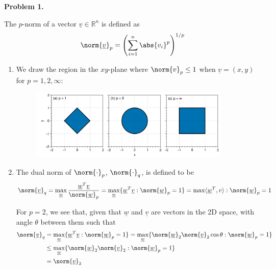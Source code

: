 \textbf{Problem 1.}

The $p$-norm of a vector $\underline{v}\in\mathbb{R}^n$ is defined as
\begin{align*}
    \norm{\underline{v}}_p = \left( \sum_{i=1}^n \abs{v_i}^p \right)^{1/p}
\end{align*}

\begin{enumerate}[label=(\roman*),leftmargin=*,itemsep=0mm]
    
    \item We draw the region in the $xy$-plane where $\norm{v}_p\leq1$ when $\underline{v}=(x,y)$ for $p=1,2,\infty$:
    
    \begin{figure}[h!]
    \centering
    \includegraphics[width=0.9\textwidth]{figures/hw2_qn1.png}\\
    \caption{}
    \label{hw2_qn1}
    \end{figure}
    
    \item The dual norm of $\norm{\cdot}_p$, $\norm{\cdot}_q$, is defined to be
    \begin{align*}
        \norm{\underline{v}}_q
        = \max_{\underline{w}} \frac{\underline{w}^T\underline{v}}{\norm{\underline{w}}_p}
        = \max_{\underline{w}}
        \{ \underline{w}^T\underline{v} : \norm{\underline{w}}_p=1 \}
        = \max \langle\underline{w}^T,v\rangle : \norm{\underline{w}}_p=1
    \end{align*}
    
    For $p=2$, we see that, given that $\underline{w}$ and $\underline{v}$ are vectors in the 2D space, with angle $\theta$ between them such that
    \begin{align*}
        \norm{\underline{v}}_q
        &= \max_{\underline{w}}
        \{ \underline{w}^T\underline{v} : \norm{\underline{w}}_p=1 \}
        = \max_{\underline{w}}
        \{ \norm{\underline{w}}_2 \norm{\underline{v}}_2 \cos\theta : \norm{\underline{w}}_p=1 \} \\
        &\leq \max_{\underline{w}}
        \{ \norm{\underline{w}}_2 \norm{\underline{v}}_2 : \norm{\underline{w}}_p=1 \} \\
        &= \norm{\underline{v}}_2
    \end{align*}
    

\end{enumerate}
